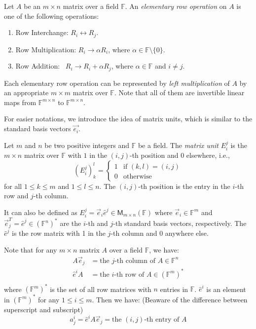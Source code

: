 \documentclass[
	11pt, %
	fleqn, %
	a4paper, %
]{LegrandOrangeBook}
\newcommand{\F}{\mathbb{F}} %
\newcommand{\M}[2]{\mathsf{M}_{#1}(#2)} %
\begin{document}
\begin{definition}
    Let $A$ be an $m \times n$ matrix over a field $\F$. An \emph{elementary row operation} on $A$ is one of the following operations:
    \begin{enumerate}
        \item Row Interchange: \qquad $R_i \leftrightarrow R_j$.
        \item Row Multiplication: \quad $R_i \to \alpha R_i$, where $\alpha \in \F \setminus \{0\}$.
        \item Row Addition: \qquad\quad\ $R_i \to R_i + \alpha R_j$, where $\alpha \in \F$ and $i \neq j$.
    \end{enumerate}
    Each elementary row operation can be represented by \emph{left multiplication} of $A$ by an appropriate $m \times m$ matrix over $\F$. Note that all of them are invertible linear maps from $\F^{m \times n}$ to $\F^{m \times n}$.
\end{definition}

For easier notations, we introduce the idea of matrix units, which is similar to the standard basis vectors $\vec{e_i}$.

\begin{definition}
    Let $m$ and $n$ be two positive integers and $\F$ be a field. The \emph{matrix unit} $E_i^j$ is the $m \times n$ matrix over $\F$ with $1$ in the $(i,j)$-th position and $0$ elsewhere, i.e.,
    \[
        (E_i^j)_k^l = \begin{cases}
            1 & \text{if } (k,l) = (i,j) \\
            0 & \text{otherwise}
        \end{cases}
    \]
    for all $1 \leq k \leq m$ and $1 \leq l \leq n$. The $(i,j)$-th position is the entry in the $i$-th row and $j$-th column.

    It can also be defined as $E_i^j = \vec{e}_i \hat{e}^j \in \M{m \times n}{\F}$ where $\vec{e}_i \in \F^m$ and $\vec{e}_j^T = \hat{e}^j \in (\F^n)^*$ are the $i$-th and $j$-th standard basis vectors, respectively. The $\hat{e}^j$ is the row matrix with 1 in the $j$-th column and 0 anywhere else.
\end{definition}
\begin{remark}
    Note that for any $m \times n$ matrix $A$ over a field $\F$, we have:
    \[
        \begin{split}
            A\vec{e}_j &= \text{the } j\text{-th column of } A \in \F^n \\
            \hat{e}^iA &= \text{the } i\text{-th row of } A \in (\F^m)^* \\
        \end{split}
    \]
    where $(\F^m)^*$ is the set of all row matrices with $n$ entries in $\F$. $\hat{e}^i$ is an element in $(\F^m)^*$ for any $1 \leq i \leq m$. Then we have: (Beaware of the difference between superscript and subscript)
    \[
        a_j^i = \hat{e}^i A \vec{e}_j = \text{the } (i,j)\text{-th entry of } A
    \]
\end{remark}
\end{document}
